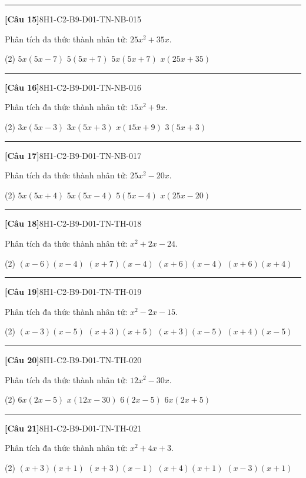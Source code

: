 \documentclass[12pt,a4paper]{article}
\newif\ifloigiai
\newenvironment{cauhoi}[2]{%
  \par\medskip\noindent\rule{\textwidth}{0.4pt}\par\nopagebreak
  \noindent\textbf{[#1]}\hfill{\scriptsize\ttfamily #2}\par\nopagebreak\smallskip}{\par}
\newcommand{\dapan}[1]{\ifloigiai\par\smallskip\noindent\textit{Đáp án:} \textbf{#1}\par\fi}
\begin{document}
\begin{cauhoi}{Câu 15}{8H1-C2-B9-D01-TN-NB-015}
Phân tích đa thức thành nhân tử: $25x^{2} + 35x$.
\begin{tasks}(2)
\task $5x(5x - 7)$
\task $5(5x + 7)$
\task $5x(5x + 7)$
\task $x(25x + 35)$
\end{tasks}
\dapan{C}
\end{cauhoi}
\begin{cauhoi}{Câu 16}{8H1-C2-B9-D01-TN-NB-016}
Phân tích đa thức thành nhân tử: $15x^{2} + 9x$.
\begin{tasks}(2)
\task $3x(5x - 3)$
\task $3x(5x + 3)$
\task $x(15x + 9)$
\task $3(5x + 3)$
\end{tasks}
\dapan{B}
\end{cauhoi}
\begin{cauhoi}{Câu 17}{8H1-C2-B9-D01-TN-NB-017}
Phân tích đa thức thành nhân tử: $25x^{2} - 20x$.
\begin{tasks}(2)
\task $5x(5x + 4)$
\task $5x(5x - 4)$
\task $5(5x - 4)$
\task $x(25x - 20)$
\end{tasks}
\dapan{B}
\end{cauhoi}
\begin{cauhoi}{Câu 18}{8H1-C2-B9-D01-TN-TH-018}
Phân tích đa thức thành nhân tử: $x^{2} + 2x - 24$.
\begin{tasks}(2)
\task $(x - 6)(x - 4)$
\task $(x + 7)(x - 4)$
\task $(x + 6)(x - 4)$
\task $(x + 6)(x + 4)$
\end{tasks}
\dapan{C}
\end{cauhoi}
\begin{cauhoi}{Câu 19}{8H1-C2-B9-D01-TN-TH-019}
Phân tích đa thức thành nhân tử: $x^{2} - 2x - 15$.
\begin{tasks}(2)
\task $(x - 3)(x - 5)$
\task $(x + 3)(x + 5)$
\task $(x + 3)(x - 5)$
\task $(x + 4)(x - 5)$
\end{tasks}
\dapan{C}
\end{cauhoi}
\begin{cauhoi}{Câu 20}{8H1-C2-B9-D01-TN-TH-020}
Phân tích đa thức thành nhân tử: $12x^{2} - 30x$.
\begin{tasks}(2)
\task $6x(2x - 5)$
\task $x(12x - 30)$
\task $6(2x - 5)$
\task $6x(2x + 5)$
\end{tasks}
\dapan{A}
\end{cauhoi}
\begin{cauhoi}{Câu 21}{8H1-C2-B9-D01-TN-TH-021}
Phân tích đa thức thành nhân tử: $x^{2} + 4x + 3$.
\begin{tasks}(2)
\task $(x + 3)(x + 1)$
\task $(x + 3)(x - 1)$
\task $(x + 4)(x + 1)$
\task $(x - 3)(x + 1)$
\end{tasks}
\dapan{A}
\end{cauhoi}
\end{document}
